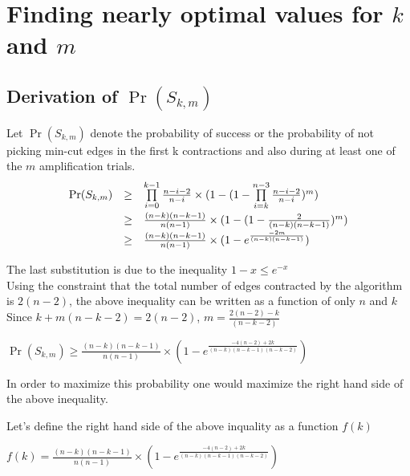 \providecommand{\f}[2]{\ensuremath{\cfrac{#1}{#2}}}

\section{Finding nearly optimal values for $k$ and $m$}
  \subsection{Derivation of $\Pr(S_{k, m})$}
   Let $\Pr(S_{k, m})$ denote the probability of success or the probability of not picking min-cut edges in the first k contractions and also during at least one of the $m$ amplification trials. \\


\[\def\arraystretch{1.5}
  \begin{array}{l l l}
        \Pr(S_{k, m}) & \geq & \prod\limits_{i=0}^{k-1} \frac{n-i-2}{n-i} \times (1 - (1 - \prod\limits_{i=k}^{n-3} \frac{n-i-2}{n-i})^m) \\
             & \geq &  \frac{(n-k)(n-k-1)}{n(n-1)} \times (1 - (1 - \frac{2}{(n-k)(n-k-1)})^m) \\
             & \geq &  \frac{(n-k)(n-k-1)}{n(n-1)} \times (1 - e^{\frac{-2m}{(n-k)(n-k-1)}}) 
  \end{array}
\]

The last substitution is due to the inequality $1-x \leq e^{-x}$ \\

Using the constraint that the total number of edges contracted by the algorithm is $2(n-2)$, the above inequality can be written as a function of only $n$ and $k$  \\

Since $k+m(n-k-2) = 2(n-2)$, $m = \frac{2(n-2)-k}{(n-k-2)}$ \\

\begin{center}
$\Pr(S_{k, m}) \geq \frac{(n-k)(n-k-1)}{n(n-1)} \times (1 - e^{\frac{-4(n-2)+2k}{(n-k)(n-k-1)(n-k-2)}})$
\end{center}

In order to maximize this probability one would maximize the right hand side of the above inequality. 

Let's define the right hand side of the above inquality as a function $f(k)$ \\ 

\begin{center}
$f(k) = \frac{(n-k)(n-k-1)}{n(n-1)} \times (1 - e^{\frac{-4(n-2)+2k}{(n-k)(n-k-1)(n-k-2)}})$
\end{center}

